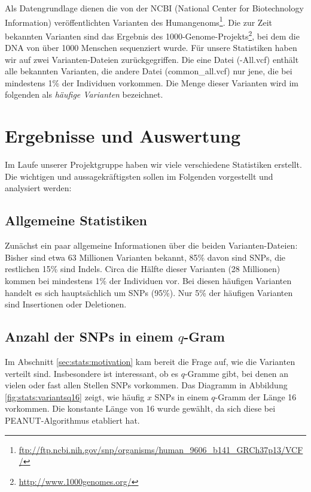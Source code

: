 Als Datengrundlage dienen die von der NCBI (National Center for Biotechnology Information) veröffentlichten Varianten des Humangenoms\footnote{
\url{ftp://ftp.ncbi.nih.gov/snp/organisms/human_9606_b141_GRCh37p13/VCF/}
}. Die zur Zeit bekannten Varianten sind das Ergebnis des 1000-Genome-Projekts\footnote{
\url{http://www.1000genomes.org/}
}, bei dem die DNA von über 1000 Menschen sequenziert wurde. Für unsere Statistiken haben wir auf zwei Varianten-Dateien zurückgegriffen. Die eine Datei 
(-All.vcf\grqq )
enthält alle bekannten Varianten, die andere Datei 
(\glqq common\_all.vcf\grqq )
nur jene, die bei mindestens 1\% der Individuen vorkommen. Die Menge dieser Varianten wird im folgenden als \emph{häufige Varianten} bezeichnet.
\newpage

\section{Ergebnisse und Auswertung} 
\label{sec:stats:res}

Im Laufe unserer Projektgruppe haben wir viele verschiedene Statistiken erstellt. Die wichtigen und aussagekräftigsten sollen im Folgenden vorgestellt und analysiert werden: 

\subsection{Allgemeine Statistiken}
\label{sec:stats:res:allg}

Zunächst ein paar allgemeine Informationen über die beiden Varianten-Dateien: Bisher sind etwa 63 Millionen Varianten bekannt, 85\% davon sind SNPs, die restlichen 15\% sind Indels. Circa die Hälfte dieser Varianten (28 Millionen) kommen bei mindestens 1\% der Individuen vor. Bei diesen häufigen Varianten handelt es sich hauptsächlich um SNPs (95\%). Nur 5\% der häufigen Varianten sind Insertionen oder Deletionen. 

\subsection{Anzahl der SNPs in einem $q$-Gram}
\label{sec:stats:res:variantsq16}

Im Abschnitt \ref{sec:stats:motivation} kam bereit die Frage auf, wie die Varianten verteilt sind. Insbesondere ist interessant, ob es $q$-Gramme gibt, bei denen an vielen oder fast allen Stellen SNPs vorkommen. Das Diagramm in Abbildung \ref{fig:stats:variantsq16} zeigt, wie häufig $x$ SNPs in einem $q$-Gramm der Länge 16 vorkommen. Die konstante Länge von 16 wurde gewählt, da sich diese bei PEANUT-Algorithmus etabliert hat.

